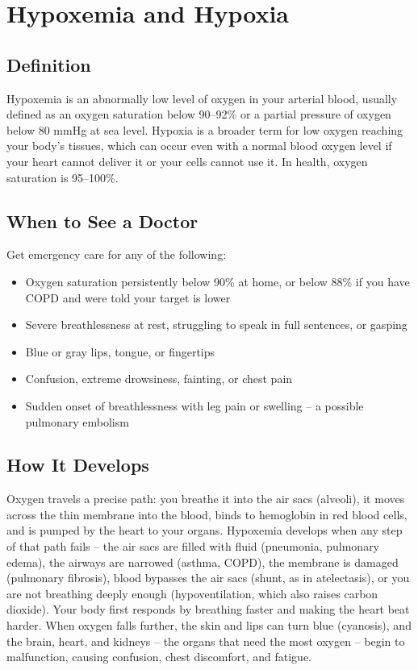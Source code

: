 \chapter{Hypoxemia and Hypoxia}

\section*{Definition}
Hypoxemia is an abnormally low level of oxygen in your arterial blood, usually defined as an oxygen saturation below 90--92\% or a partial pressure of oxygen below 80 mmHg at sea level. Hypoxia is a broader term for low oxygen reaching your body's tissues, which can occur even with a normal blood oxygen level if your heart cannot deliver it or your cells cannot use it. In health, oxygen saturation is 95--100\%.

\section*{When to See a Doctor}
Get emergency care for any of the following:
\begin{itemize}
  \item Oxygen saturation persistently below 90\% at home, or below 88\% if you have COPD and were told your target is lower
  \item Severe breathlessness at rest, struggling to speak in full sentences, or gasping
  \item Blue or gray lips, tongue, or fingertips
  \item Confusion, extreme drowsiness, fainting, or chest pain
  \item Sudden onset of breathlessness with leg pain or swelling -- a possible pulmonary embolism
\end{itemize}

\section*{How It Develops}
Oxygen travels a precise path: you breathe it into the air sacs (alveoli), it moves across the thin membrane into the blood, binds to hemoglobin in red blood cells, and is pumped by the heart to your organs. Hypoxemia develops when any step of that path fails -- the air sacs are filled with fluid (pneumonia, pulmonary edema), the airways are narrowed (asthma, COPD), the membrane is damaged (pulmonary fibrosis), blood bypasses the air sacs (shunt, as in atelectasis), or you are not breathing deeply enough (hypoventilation, which also raises carbon dioxide). Your body first responds by breathing faster and making the heart beat harder. When oxygen falls further, the skin and lips can turn blue (cyanosis), and the brain, heart, and kidneys -- the organs that need the most oxygen -- begin to malfunction, causing confusion, chest discomfort, and fatigue.

